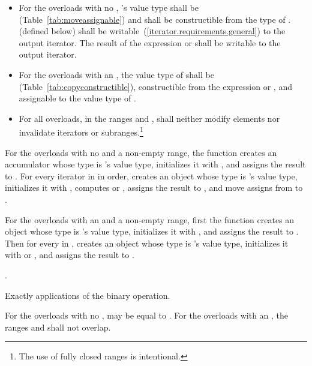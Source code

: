 \begin{itemdescr}
\pnum
\requires
\begin{itemize}
\item
For the overloads with no , 's value
type shall be  (Table~\ref{tab:moveassignable}) and shall
be constructible from the type of .  (defined below)
shall be writable~(\ref{iterator.requirements.general}) to the 
output iterator.  The result of the expression  or
 shall be writable to the  output iterator.

\item
For the overloads with an , the value type of
shall be  (Table~\ref{tab:copyconstructible}),
constructible from the expression  or
, and assignable to the value type of
.

\item
For all overloads, in the ranges
and
,
shall neither modify elements nor invalidate iterators or
subranges.\footnote{The use of fully closed ranges is intentional.}
\end{itemize}

\pnum
\effects For the overloads with no  and a non-empty range,
the function creates an accumulator  whose type is 's
value type, initializes it with ,
and assigns the result to . For every iterator  in 
in order, creates an object  whose type is 's value type, initializes it
with , computes  or , assigns the result
to , and move assigns from  to .

\pnum
For the overloads with an  and a non-empty range, first the
function creates an object whose type is 's value type,
initializes it with , and assigns the result to .
Then for every 
in , creates an object  whose type is
's value type, initializes it with
 or
, and assigns the result to
.

\pnum
\returns
{}.

\pnum
\complexity
Exactly
applications of
the binary operation.

\pnum
\remarks
For the overloads with no ,  may be equal
to .  For the overloads with an , the ranges
 and  shall not overlap.
\end{itemdescr}

